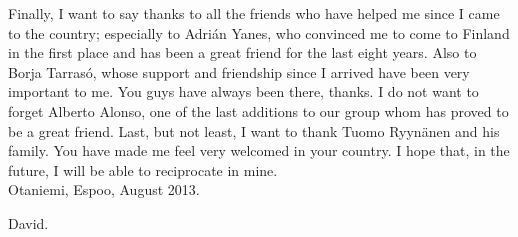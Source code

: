 Finally, I want to say thanks to all the friends who have helped me since I came to the country; especially to Adrián Yanes, who convinced me to come to Finland in the first place and has been a great friend for the last eight years. Also to Borja Tarrasó, whose support and friendship since I arrived have been very important to me. You guys have always been there, thanks. I do not want to forget Alberto Alonso, one of the last additions to our group whom has proved to be a great friend. Last, but not least, I want to thank Tuomo Ryynänen and his family. You have made me feel very welcomed in your country. I hope that, in the future, I will be able to reciprocate in mine.\\




\vspace{1cm}
Otaniemi, Espoo, August 2013.

\vspace{0.5cm}
David.
\thispagestyle{plain}
\pagebreak

\tableofcontents

\pagebreak
